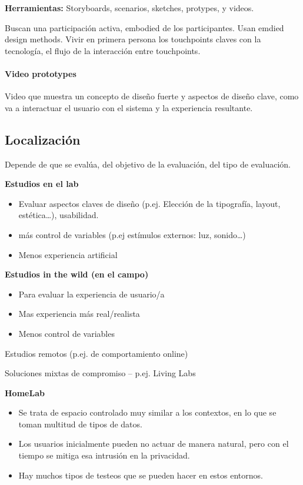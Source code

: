 \documentclass[12pt]{report} %
\begin{document}
\textbf{Herramientas:} Storyboards, scenarios, sketches, protypes, y videos.

Buscan una participación activa, embodied de los participantes. Usan emdied design methods. Vivir en primera persona los touchpoints claves con la tecnología, el flujo de la interacción entre touchpoints.

\paragraph{Video prototypes}
Video que muestra un concepto de diseño fuerte y aspectos de diseño clave, como va a interactuar el usuario con el sistema y la experiencia resultante.

\subsection{Localización}
Depende de que se evalúa, del objetivo de la evaluación, del tipo de evaluación.

\textbf{Estudios en el lab}
\begin{itemize}
  \item Evaluar aspectos claves de diseño (p.ej. Elección de la tipografía, layout, estética…),
  usabilidad.
  \item más control de variables (p.ej estímulos externos: luz, sonido…)
  \item Menos experiencia artificial
\end{itemize}

\textbf{Estudios in the wild (en el campo)}
\begin{itemize}
  \item Para evaluar la experiencia de usuario/a
  \item Mas experiencia más real/realista
  \item Menos control de variables
\end{itemize}

Estudios remotos (p.ej. de comportamiento online)

Soluciones mixtas de compromiso – p.ej. Living Labs

\textbf{HomeLab}
\begin{itemize}
  \item Se trata de espacio controlado muy similar a los contextos, en lo que se toman multitud de tipos de datos.
  \item Los usuarios inicialmente pueden no actuar de manera natural, pero con el tiempo se mitiga esa intrusión en la privacidad.
  \item Hay muchos tipos de testeos que se pueden hacer en estos entornos.
\end{itemize}
\end{document}
